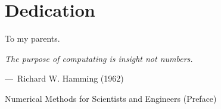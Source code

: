 
\chapter{Dedication}

To my parents.

\pagebreak
\hspace{0pt}
\vfill
\begin{epigraph}
    \emph{
        The purpose of computating is insight not numbers.
    }
    \vspace{1em}

    ---~Richard W. Hamming (1962)

    Numerical Methods for Scientists and Engineers (Preface)
\end{epigraph}
\vfill
\hspace{0pt}
\pagebreak
